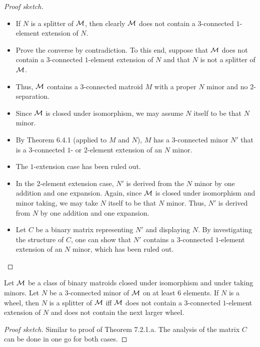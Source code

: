 \begin{proof}[Proof sketch]
  \begin{itemize}
    \item If $N$ is a splitter of $\mathcal{M}$, then clearly $\mathcal{M}$ does not contain a $3$-connected $1$-element extension of $N$.
    \item Prove the converse by contradiction. To this end, suppose that $\mathcal{M}$ does not contain a $3$-connected $1$-element extension of $N$ and that $N$ is not a splitter of $\mathcal{M}$.
    \item Thus, $\mathcal{M}$ contains a $3$-connected matroid $M$ with a proper $N$ minor and no $2$-separation.
    \item Since $\mathcal{M}$ is closed under isomorphism, we may assume $N$ itself to be that $N$ minor.
    \item By Theorem 6.4.1 (applied to $M$ and $N$), $M$ has a $3$-connected minor $N'$ that is a $3$-connected $1$- or $2$-element extension of an $N$ minor.
    \item The $1$-extension case has been ruled out.
    \item In the $2$-element extension case, $N'$ is derived from the $N$ minor by one addition and one expansion. Again, since $\mathcal{M}$ is closed under isomorphism and minor taking, we may take $N$ itself to be that $N$ minor. Thus, $N'$ is derived from $N$ by one addition and one expansion.
    \item Let $C$ be a binary matrix representing $N'$ and displaying $N$. By investigating the structure of $C$, one can show that $N'$ contains a $3$-connected $1$-element extension of an $N$ minor, which has been ruled out.
  \end{itemize}
\end{proof}

\begin{theorem}
  \label{thm:7.2.1.b}
  Let $\mathcal{M}$ be a class of binary matroids closed under isomorphism and under taking minors. Let $N$ be a $3$-connected minor of $\mathcal{M}$ on at least $6$ elements.
  If $N$ is a wheel, then $N$ is a splitter of $\mathcal{M}$ iff $\mathcal{M}$ does not contain a $3$-connected $1$-element extension of $N$ and does not contain the next larger wheel.
\end{theorem}

\begin{proof}[Proof sketch]
  Similar to proof of Theorem 7.2.1.a. The analysis of the matrix $C$ can be done in one go for both cases.
\end{proof}

